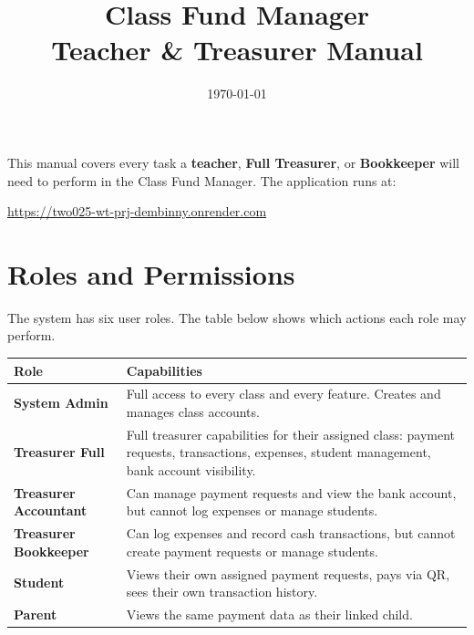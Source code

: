 \documentclass[a4paper,11pt]{article}
\title{\textbf{Class Fund Manager}\\[0.4em]
       \large Teacher \& Treasurer Manual}
\author{}
\date{\today}
\begin{document}
\maketitle
\thispagestyle{empty}
\vspace{1em}

\noindent
This manual covers every task a \textbf{teacher}, \textbf{Full Treasurer}, or
\textbf{Bookkeeper} will need to perform in the Class Fund Manager.
The application runs at:
\begin{center}
    \url{https://two025-wt-prj-dembinny.onrender.com}
\end{center}

\tableofcontents
\newpage

\section{Roles and Permissions}

The system has six user roles.
The table below shows which actions each role may perform.

\begin{longtable}{>{\bfseries}p{4.5cm} p{8.5cm}}
\toprule
Role & Capabilities \\
\midrule
\endhead
System Admin    & Full access to every class and every feature.
                  Creates and manages class accounts. \\
Treasurer Full  & Full treasurer capabilities for their assigned class:
                  payment requests, transactions, expenses, student management,
                  bank account visibility. \\
Treasurer Accountant & Can manage payment requests and view the bank account,
                  but cannot log expenses or manage students. \\
Treasurer Bookkeeper & Can log expenses and record cash transactions,
                  but cannot create payment requests or manage students. \\
Student         & Views their own assigned payment requests, pays via QR,
                  sees their own transaction history. \\
Parent          & Views the same payment data as their linked child. \\
\bottomrule
\end{longtable}
\end{document}
